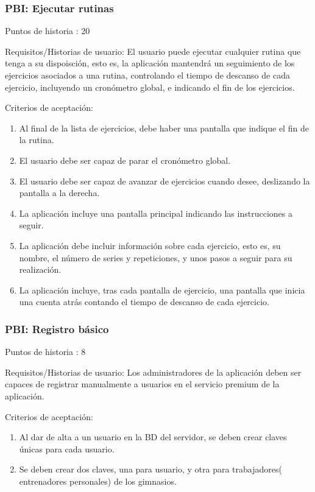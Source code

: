 \documentclass[11pt,a4paper]{report}
\begin{document}
\subsubsection{PBI: Ejecutar rutinas}

Puntos de historia : 20

Requisitos/Historias de usuario: El usuario puede ejecutar cualquier rutina que tenga a su dispoisción, esto es, la aplicación mantendrá un seguimiento de los ejercicios asociados a una rutina, controlando el tiempo de descanso de cada ejercicio, incluyendo un cronómetro global, e indicando el fin de los ejercicios.

Criterios de aceptación:
\begin{enumerate}
	\item Al final de la lista de ejercicios, debe haber una pantalla que indique el fin de la rutina.
	
	\item El usuario debe ser capaz de parar el cronómetro global.
	
	\item El usuario debe ser capaz de avanzar de ejercicios cuando desee, deslizando la pantalla a la derecha.
	
	\item La aplicación incluye una pantalla principal indicando las instrucciones a seguir.
	
	\item La aplicación debe incluir información sobre cada ejercicio, esto es, su nombre, el número de series y repeticiones, y unos pasos a seguir para su realización.
	
	\item La aplicación incluye, tras cada pantalla de ejercicio, una pantalla que inicia una cuenta atrás contando el tiempo de descanso de cada ejercicio.
	
\end{enumerate}
\subsubsection{PBI: Registro básico}
Puntos de historia : 8

Requisitos/Historias de usuario: Los administradores de la aplicación deben ser capaces de registrar manualmente a usuarios en el servicio premium de la aplicación.

Criterios de aceptación:
\begin{enumerate}
	\item Al dar de alta a un usuario en la BD del servidor, se deben crear claves únicas para cada usuario.
	
	\item Se deben crear dos claves, una para usuario, y otra para trabajadores( entrenadores personales) de los gimnasios.
	
\end{enumerate}
\end{document}
